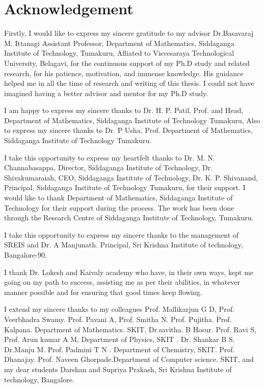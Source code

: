 \chapter*{Acknowledgement}

Firstly, I would like to express my sincere gratitude to my advisor Dr.Basavaraj M. Ittanagi Assistant Professor, Department of Mathematics, Siddaganga Institute of Technology, Tumakuru, Afliated to Visvesaraya Technological University, Belagavi, for the continuous support of my Ph.D study and related research, for his patience, motivation, and immense knowledge. His guidance helped me in all the time of research and writing of this thesis. I could not have imagined having a better advisor and mentor for my Ph.D study.

I am happy to express my sincere thanks to Dr. H. P. Patil, Prof. and Head, Department of Mathematics, Siddaganga Institute of Technology Tumakuru, Also to express my sincere thanks to Dr. P Usha, Prof. Department of Mathematics, Siddaganga Institute of Technology Tumakuru.


I take this opportunity to express my heartfelt thanks to Dr. M. N. Channabasappa, Director, Siddaganga Institute of Technology, Dr. Shivakumaraiah, CEO, Siddaganga Institute of Technology, Dr. K. P. Shivanand, Principal, Siddaganga Institute of Technology Tumakuru, for their support. I would like to thank Department of Mathematics, Siddaganga Institute of Technology for their support during the process. The work has been done through the Research Centre of Siddaganga Institute of Technology, Tumakuru.

I take this opportunity to express my sincere thanks to the management of SREIS and Dr. A Manjunath. Principal, Sri Krishna Institute of technology, Bangalore-90.

I thank Dr. Lokesh and Kaivaly academy who have, in their own ways, kept me going on my path to success, assisting me as per their abilities, in whatever manner possible and for ensuring that good times keep flowing.

I extend my sincere thanks to my colleagues Prof. Mallikarjun G D, Prof. Veerbhadra Swamy. Prof. Pavani A, Prof. Smitha N. Prof. Pujitha. Prof. Kalpana. Department of Mathematics. SKIT, Dr.savitha. B Hosur. Prof. Ravi S, Prof. Arun kumar A M, Department of Physics, SKIT . Dr. Shankar B S. Dr.Manju M. Prof. Padmini T N . Department of Chemistry, SKIT. Prof. Dhanajay. Prof. Naveen Ghorpade.Department of Computer science. SKIT, and my dear students Darshan and Supriya Prakash, Sri Krishna Institute of technology, Bangalore.

